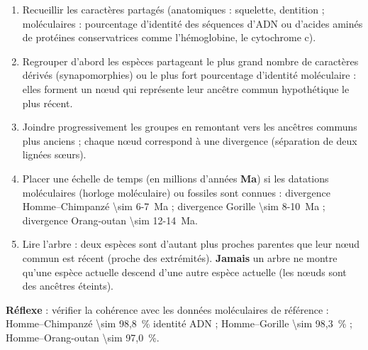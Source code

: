 \documentclass[11pt]{article}
\newcommand{\cle}[1]{{\popxbold\color{popdark}#1}}
\begin{document}
\begin{methode}
\begin{enumerate}
\item \cle{Recueillir} les caractères partagés (anatomiques : squelette, dentition ; moléculaires : pourcentage d'identité des séquences d'ADN ou d'acides aminés de protéines conservatrices comme l'hémoglobine, le cytochrome c).
\item \cle{Regrouper} d'abord les espèces partageant le plus grand nombre de caractères dérivés (synapomorphies) ou le plus fort pourcentage d'identité moléculaire : elles forment un \cle{nœud} qui représente leur \cle{ancêtre commun} hypothétique le plus récent.
\item \cle{Joindre} progressivement les groupes en remontant vers les ancêtres communs plus anciens ; chaque nœud correspond à une \cle{divergence} (séparation de deux lignées sœurs).
\item \cle{Placer} une échelle de temps (en millions d'années \textbf{Ma}) si les datations moléculaires (horloge moléculaire) ou fossiles sont connues : divergence Homme--Chimpanzé \SI{\sim 6-7}{Ma} ; divergence Gorille \SI{\sim 8-10}{Ma} ; divergence Orang-outan \SI{\sim 12-14}{Ma}.
\item \cle{Lire} l'arbre : deux espèces sont d'autant plus proches parentes que leur nœud commun est récent (proche des extrémités). \textbf{Jamais} un arbre ne montre qu'une espèce actuelle descend d'une autre espèce actuelle (les nœuds sont des ancêtres éteints).
\end{enumerate}
\textbf{Réflexe} : vérifier la cohérence avec les données moléculaires de référence : Homme--Chimpanzé \SI{\sim 98,8}{\%} identité ADN ; Homme--Gorille \SI{\sim 98,3}{\%} ; Homme--Orang-outan \SI{\sim 97,0}{\%}.
\end{methode}
\end{document}
